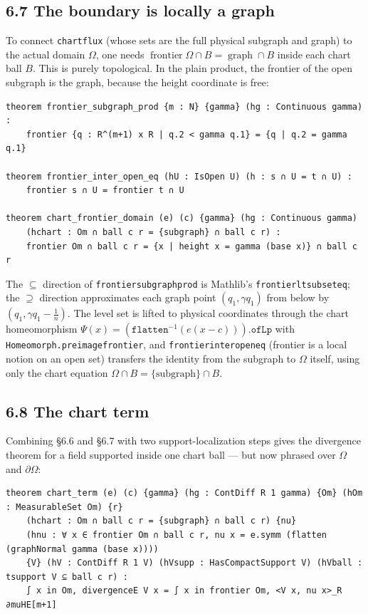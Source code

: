 ﻿\documentclass[12pt, a4paper]{article}
\renewcommand{\_}{\origunderscore\allowbreak}
\theoremstyle{definition}
\theoremstyle{plain}
\begin{document}
\subsection{6.7 The boundary is locally a graph}

To connect \texttt{chart\_flux} (whose sets are the full physical subgraph and graph) to the actual
domain $\Omega$, one needs $\operatorname{frontier}\Omega\cap B = \operatorname{graph}\cap B$ inside
each chart ball $B$.  This is purely topological.  In the plain product, the frontier of the open
subgraph is the graph, because the height coordinate is free:

\begin{lstlisting}[caption={Frontier of a subgraph is the graph; locality; and the domain version}]
theorem frontier_subgraph_prod {m : N} {gamma} (hg : Continuous gamma) :
    frontier {q : R^(m+1) x R | q.2 < gamma q.1} = {q | q.2 = gamma q.1}

theorem frontier_inter_open_eq (hU : IsOpen U) (h : s ∩ U = t ∩ U) :
    frontier s ∩ U = frontier t ∩ U

theorem chart_frontier_domain (e) (c) {gamma} (hg : Continuous gamma)
    (hchart : Om ∩ ball c r = {subgraph} ∩ ball c r) :
    frontier Om ∩ ball c r = {x | height x = gamma (base x)} ∩ ball c r
\end{lstlisting}

The $\subseteq$ direction of \texttt{frontier\_subgraph\_prod} is Mathlib's
\texttt{frontier\_lt\_subset\_eq}; the $\supseteq$ direction approximates each graph point
$(q_1,\gamma q_1)$ from below by $(q_1,\gamma q_1-\tfrac1n)$.  The level set is lifted to physical
coordinates through the chart homeomorphism $\Psi(x)=(\texttt{flatten}^{-1}(e(x-c))).\texttt{ofLp}$
with \texttt{Homeomorph.preimage\_frontier}, and \texttt{frontier\_inter\_open\_eq} (frontier is a
local notion on an open set) transfers the identity from the subgraph to $\Omega$ itself, using only
the chart equation $\Omega\cap B=\{\text{subgraph}\}\cap B$.

\subsection{6.8 The chart term}

Combining \S6.6 and \S6.7 with two support-localization steps gives the divergence theorem for a
field supported inside one chart ball --- but now phrased over $\Omega$ and $\partial\Omega$:

\begin{lstlisting}[caption={Single-chart divergence theorem in the domain}]
theorem chart_term (e) (c) {gamma} (hg : ContDiff R 1 gamma) {Om} (hOm : MeasurableSet Om) {r}
    (hchart : Om ∩ ball c r = {subgraph} ∩ ball c r) {nu}
    (hnu : ∀ x ∈ frontier Om ∩ ball c r, nu x = e.symm (flatten (graphNormal gamma (base x))))
    {V} (hV : ContDiff R 1 V) (hVsupp : HasCompactSupport V) (hVball : tsupport V ⊆ ball c r) :
    ∫ x in Om, divergenceE V x = ∫ x in frontier Om, <V x, nu x>_R ∂muHE[m+1]
\end{lstlisting}
\end{document}

